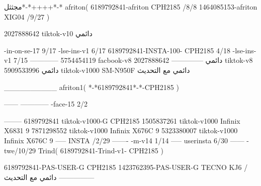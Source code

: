 مجثثل*-*++++*-*
afriton(
6189792841-afriton CPH2185  /8/8
1464085153-afriton XIG04  /9/27
)

2027888642 tiktok-v10
دائمي

-in-on-se-17 9/17
-lse-ins-v1 6/17
6189792841-INSTA-100- CPH2185 4/18
-lse-ins-v1 7/15
------------
5754454119 facbook-v8
دائمي
--------------
2027888642 tiktok-v8
دائمي
5909533996 tiktok-v1000  SM-N950F
دائمي مع التحديث

__________
afriton1(
*-*6189792841*-*-CPH2185
)


------
------------
-face-15 2/2

--------
6189792841 tiktok-v1000-G CPH2185 
1505837261 tiktok-v1000 Infinix X6831 9
7871298552 tiktok-v1000 Infinix X676C 9
5323380007 tiktok-v1000  Infinix X676C 9
-----
 INSTA /2/29
-------
-m-v14 1/14
-----
userinsta 6/30
------
-twe/10/29
Trind(
6189792841-Trind-v1- CPH2185 
)


6189792841-PAS-USER-G CPH2185 
1423762395-PAS-USER-G TECNO KJ6  /دائمي مع التحديث
    ---------------

